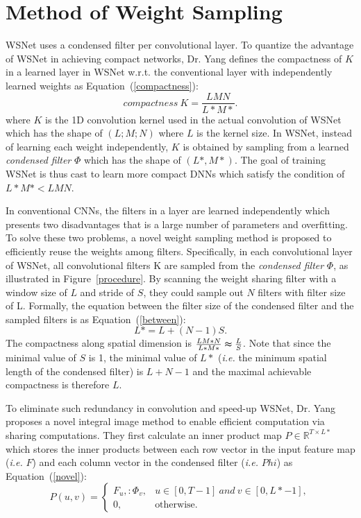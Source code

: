 \documentclass[10pt,twocolumn,letterpaper]{article}
\begin{document}
\section{Method of Weight Sampling}

WSNet uses a condensed filter per convolutional layer. To quantize the advantage of WSNet in achieving compact networks, Dr. Yang defines the compactness of $K$ in a learned layer in WSNet w.r.t. the conventional layer with independently learned weights as Equation~(\ref{compactness}):
\begin{equation}
compactness~K=\frac{L M N}{L*M*}.     \label{compactness}
\end{equation}
where $K$ is the 1D convolution kernel used in the actual convolution of WSNet which has the shape of $(L;M;N)$ where $L$ is the kernel size. In WSNet, instead of learning each weight independently, $K$ is obtained by sampling from a learned \emph{condensed filter} $\Phi$ which has the shape of $(L*,M*)$. The goal of training WSNet is thus cast to learn more compact DNNs which satisfy the condition of $L*M*<LMN$.

In conventional CNNs, the filters in a layer are learned independently which presents two disadvantages that is a large number of parameters and overfitting. To solve these two problems, a novel weight sampling method is proposed to efficiently reuse the weights among filters. Specifically, in each convolutional layer of WSNet, all convolutional filters K are sampled from the \emph{condensed filter} $\Phi$, as illustrated in Figure~\ref{procedure}. By scanning the weight sharing filter with a window size of $L$ and stride of $S$, they could sample out $N$ filters with filter size of L. Formally, the equation between the filter size of the condensed filter and the sampled filters is as Equation~(\ref{between}):
\begin{equation}
L*=L+(N-1)S.     \label{between}
\end{equation}
The compactness along spatial dimension is $\frac{LM*N}{L*M*}\thickapprox \frac{L}{S}$. Note that since the minimal value of $S$ is 1, the minimal value of $L*$ (\emph{i.e.} the minimum spatial length of the condensed filter) is $L+N-1$ and the maximal achievable compactness is therefore $L$.

To eliminate such redundancy in convolution and speed-up WSNet, Dr. Yang proposes a novel integral image method to enable efficient computation via sharing computations. They first calculate an inner product map $P\in \mathbb{R}^{T\times L*}$ which stores the inner products between each row vector in the input feature map (\emph{i.e.} $F$) and each column vector in the condensed filter (\emph{i.e.} $Phi$) as Equation~(\ref{novel}):
\begin{equation}
P(u,v)=
\begin{cases}
F_u,:\Phi_v, & u\in[0,T-1]~and~v\in [ 0,L*-1], \\
0, & \mbox{otherwise}.
\end{cases}      \label{novel}
\end{equation}
\end{document}
